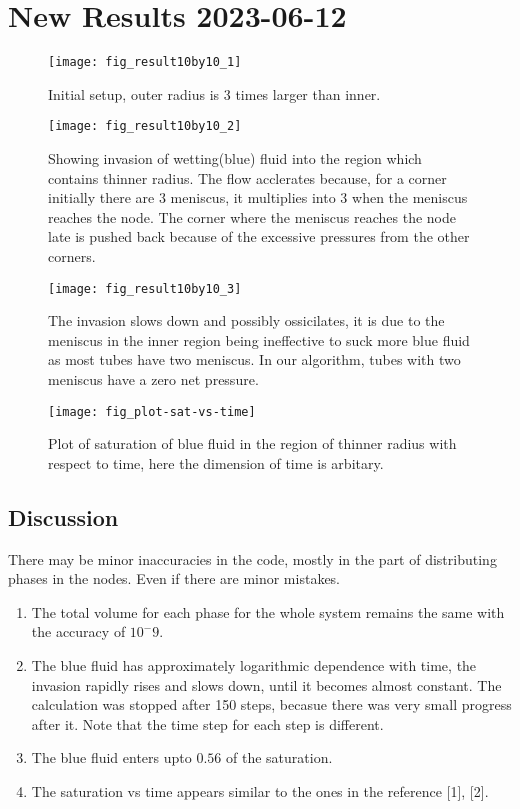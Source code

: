 \section{New Results 2023-06-12}

	\begin{figure}[H]
		\texttt{[image: fig\_result10by10\_1]}
		\caption{Initial setup, outer radius is 3 times larger than inner.}
		\label{fig_invasion-result1}
	\end{figure}
	
	\begin{figure}[H]
		\texttt{[image: fig\_result10by10\_2]}
		\caption{Showing invasion of wetting(blue) fluid into the region which contains thinner radius. The flow acclerates because, for a corner initially there are 3 meniscus, it multiplies into 3 when the meniscus reaches the node. The corner where the meniscus reaches the node late is pushed back because of the excessive pressures from the other corners.}
		\label{fig_invasion-result2}
	\end{figure}
	
	
	\begin{figure}[H]
		\texttt{[image: fig\_result10by10\_3]}
		\caption{The invasion slows down and possibly ossicilates, it is due to the meniscus in the inner region being ineffective to suck more blue fluid as most tubes have two meniscus. In our algorithm, tubes with two meniscus have a zero net pressure.}
		\label{fig_invasion-result3}
	\end{figure}
	
	\begin{figure}[H]
		\texttt{[image: fig\_plot-sat-vs-time]}
		\caption{Plot of saturation of blue fluid in the region of thinner radius with respect to time, here the dimension of time is arbitary.}
		\label{fig_plot-sat-vs-time}
	\end{figure}
	
	\subsection{Discussion}
		There may be minor inaccuracies in the code, mostly in the part of distributing phases in the nodes. Even if there are minor mistakes. 
		\begin{enumerate}
			\item The total volume for each phase for the whole system remains the same with the accuracy of $10^-9$.
			\item The blue fluid has approximately logarithmic dependence with time, the invasion rapidly rises and slows down, until it becomes almost constant. The calculation was stopped after 150 steps, becasue there was very small progress after it. Note that the time step for each step is different.
			\item The blue fluid enters upto $0.56$ of the saturation.
			\item The saturation vs time appears similar to the ones in the reference [1], [2].
		\end{enumerate}


